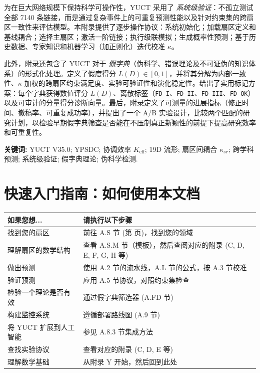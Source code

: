 \documentclass[11pt,a4paper]{article}
\newcommand{\Keff}{K_{\mathrm{eff}}}
\begin{document}
\begin{titlepage}
\begin{center}
\begin{minipage}{0.92\textwidth}
				为在巨大网络规模下保持科学可操作性，YUCT 采用了 \emph{系统级验证}：不孤立测试全部 7140 条链接，而是通过复杂事件上的可重复预测性能以及针对约束集的跨扇区一致性来评估模型。本附录提供了逐步操作协议：系统初始化；加载扇区定义和基线耦合；选择主扇区；激活一阶链接；执行级联模拟；生成概率性预测；基于历史数据、专家知识和机器学习（加正则化）迭代校准 $\kappa$。
				
				此外，附录还包含了 YUCT 对于 \emph{假字典}（伪科学、错误理论及不可证伪的知识体系）的形式化处理。定义了假度得分 $L(D)\in[0,1]$，并将其分解为内部一致性、$\kappa$ 加权的跨扇区约束满足度、实验可验证性和演化稳定性。给出了实用标记方案：每个字典获得数值评分 $L(D)$、离散标签（\texttt{FD-I}、\texttt{FD-II}、\texttt{FD-III}、\texttt{FD-OK}）以及可审计的分量得分诊断向量。最后，附录定义了可测量的进展指标（修正时间、撤稿率、可重复成功率），并提出了一个 A/B 实验设计，比较两个匹配的研究计划，以检验早期假字典筛查是否能在不压制真正新颖性的前提下提高研究效率和可重复性。
			\end{minipage}
			
			\vfill
			\small
			\textbf{关键词:} YUCT V35.0; YPSDC; 协调效率 $\Keff$; 19D 流形; 扇区间耦合 $\kappa_{sr}$; 跨学科预测; 系统级验证; 假字典理论; 伪科学检测.
		\end{center}
	\end{titlepage}
	
	\section*{快速入门指南：如何使用本文档}
	
	\begin{tabularx}{\textwidth}{|p{3.5cm}|X|}
		\hline
		\textbf{如果您想...} & \textbf{请执行以下步骤} \\
		\hline
		找到您的扇区 & 前往 A.S 节 (第 \pageref{sec:sector-catalog} 页)，找到您的领域 \\
		\hline
		理解扇区的数学结构 & 查看 A.S.M 节（模板），然后查阅对应的附录 (C, D, E, F, G, H 等) \\
		\hline
		做出预测 & 使用 A.2 节的流水线，A.L 节的公式，按 A.3 节校准 \\
		\hline
		验证预测 & 应用 A.5 节协议，对照约束集检查 \\
		\hline
		检验一个理论是否有效 & 通过假字典筛选器 (A.FD 节) \\
		\hline
		构建监控系统 & 遵循部署路线图 (A.9 节) \\
		\hline
		将 YUCT 扩展到人工智能 & 参见 A.8.3 节集成方法 \\
		\hline
		查找实验协议 & 查看对应的附录 (C, D, E 等) \\
		\hline
		理解数学基础 & 从附录 Y 开始，然后回到此处 \\
		\hline
	\end{tabularx}
	
\end{document}
